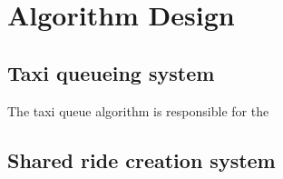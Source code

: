 \section{Algorithm Design}

\subsection{Taxi queueing system}
	The taxi queue algorithm is responsible for the
\subsection{Shared ride creation system}
		